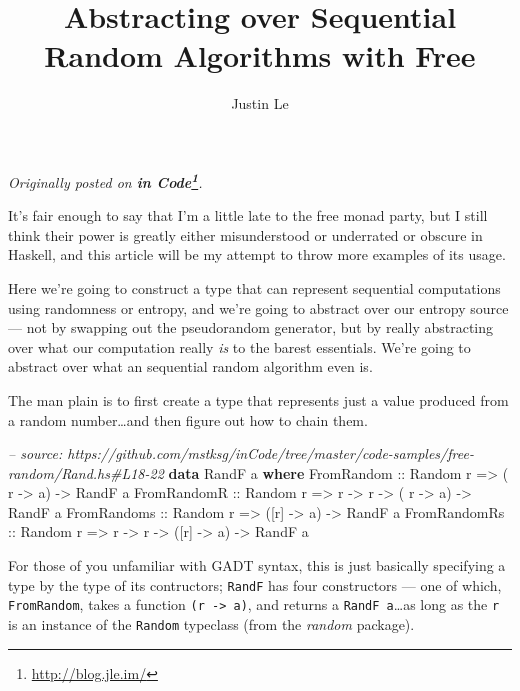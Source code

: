 \documentclass[]{article}
\title{Abstracting over Sequential Random Algorithms with Free}
\author{Justin Le}
\newenvironment{Shaded}{}{}
\newcommand{\KeywordTok}[1]{\textcolor[rgb]{0.00,0.44,0.13}{\textbf{{#1}}}}
\newcommand{\DataTypeTok}[1]{\textcolor[rgb]{0.56,0.13,0.00}{{#1}}}
\newcommand{\CommentTok}[1]{\textcolor[rgb]{0.38,0.63,0.69}{\textit{{#1}}}}
\newcommand{\OtherTok}[1]{\textcolor[rgb]{0.00,0.44,0.13}{{#1}}}
\newcommand{\NormalTok}[1]{{#1}}
\renewcommand{\href}[2]{#2\footnote{\url{#1}}}
\begin{document}
\maketitle

\emph{Originally posted on \textbf{\href{http://blog.jle.im/}{in
Code}}.}

It's fair enough to say that I'm a little late to the free monad party,
but I still think their power is greatly either misunderstood or
underrated or obscure in Haskell, and this article will be my attempt to
throw more examples of its usage.

Here we're going to construct a type that can represent sequential
computations using randomness or entropy, and we're going to abstract
over our entropy source --- not by swapping out the pseudorandom
generator, but by really abstracting over what our computation really
\emph{is} to the barest essentials. We're going to abstract over what an
sequential random algorithm even is.

The man plain is to first create a type that represents just a value
produced from a random number\ldots{}and then figure out how to chain
them.

\begin{Shaded}
\begin{Highlighting}[]
\CommentTok{-- source: https://github.com/mstksg/inCode/tree/master/code-samples/free-random/Rand.hs#L18-22}
\KeywordTok{data} \DataTypeTok{RandF} \NormalTok{a }\KeywordTok{where}
    \DataTypeTok{FromRandom}\OtherTok{   ::} \DataTypeTok{Random} \NormalTok{r }\OtherTok{=>}           \NormalTok{( r  }\OtherTok{->} \NormalTok{a) }\OtherTok{->} \DataTypeTok{RandF} \NormalTok{a}
    \DataTypeTok{FromRandomR}\OtherTok{  ::} \DataTypeTok{Random} \NormalTok{r }\OtherTok{=>} \NormalTok{r }\OtherTok{->} \NormalTok{r }\OtherTok{->} \NormalTok{( r  }\OtherTok{->} \NormalTok{a) }\OtherTok{->} \DataTypeTok{RandF} \NormalTok{a}
    \DataTypeTok{FromRandoms}\OtherTok{  ::} \DataTypeTok{Random} \NormalTok{r }\OtherTok{=>}           \NormalTok{([r] }\OtherTok{->} \NormalTok{a) }\OtherTok{->} \DataTypeTok{RandF} \NormalTok{a}
    \DataTypeTok{FromRandomRs}\OtherTok{ ::} \DataTypeTok{Random} \NormalTok{r }\OtherTok{=>} \NormalTok{r }\OtherTok{->} \NormalTok{r }\OtherTok{->} \NormalTok{([r] }\OtherTok{->} \NormalTok{a) }\OtherTok{->} \DataTypeTok{RandF} \NormalTok{a}
\end{Highlighting}
\end{Shaded}

For those of you unfamiliar with GADT syntax, this is just basically
specifying a type by the type of its contructors; \texttt{RandF} has
four constructors --- one of which, \texttt{FromRandom}, takes a
function \texttt{(r\ -\textgreater{}\ a)}, and returns a
\texttt{RandF\ a}\ldots{}as long as the \texttt{r} is an instance of the
\texttt{Random} typeclass (from the \emph{random} package).
\end{document}
